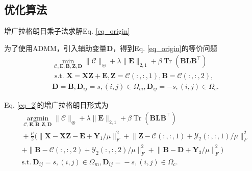 \documentclass{beamer}
\begin{document}
\subsection{优化算法}

\begin{frame}{增广拉格朗日乘子法求解Eq. \eqref{eq_origin}}

    为了使用ADMM，引入辅助变量$\mathbf{D}$，得到Eq. \eqref{eq_origin}的等价问题
	\begin{equation}
		\begin{aligned}
			&\min_{\mathcal{C}, \mathbf{E}, \mathbf{B}, \mathbf{Z}, \mathbf{D} }\|\mathcal{C}\|_{\circledast}+\lambda\|\mathbf{E}\|_{2,1}+\beta\operatorname{Tr}(\mathbf{B L B}^{\top}) \\
			&\text { s.t. } \mathbf{X}=\mathbf{X Z}+\mathbf{E}, \mathbf{Z}=\mathcal{C}(:,:,1), \mathbf{B}=\mathcal{C}(:,:,2),\\
			&\mathbf{D}=\mathbf{B}, \mathbf{D}_{i j}=s,(i, j) \in \Omega_{m}, \mathbf{D}_{i j}=-s,(i, j) \in \Omega_{c}. 
		\end{aligned}
		\label{eq_2}
	\end{equation}

    Eq. \eqref{eq_2}的增广拉格朗日形式为
	\begin{equation}
		\begin{aligned}
			&\underset{\mathcal{C}, \mathbf{E}, \mathbf{B}, \mathbf{Z}, \mathbf{D}}{\operatorname{argmin}}\|\mathcal{C}\|_{\circledast}\!+\!\lambda\|\mathbf{E}\|_{2,1}\!+\!\beta\operatorname{Tr}(\mathbf{B L B}^{\top}) \\
			&\!+\!\frac{\mu}{2}\!(\|\mathbf{X}\!-\!\mathbf{X\!Z}\!-\!\mathbf{E}\!+\!\mathbf{Y}_{1}\!/ \mu\|_{F}^{2}\!+\!\|\mathbf{Z}\!-\!\mathcal{C}\!(:\!,\!:\!,\!1\!)\!+\!\mathcal{Y}_{2}\!(:\!,\!:\!,\!1\!)\!/\! \mu\|_{F}^{2}\\
			&+\|\mathbf{B}\!-\!\mathcal{C}(:,:,2)\!+\!\mathcal{Y}_{2}(:,:,2)\!/\! \mu\|_{F}^{2}\!+\!\|\mathbf{B}\!-\!\mathbf{D}\!+\!\mathbf{Y}_{3}\!/\!\mu\|_{F}^{2}) \\
			&\text {s.t.}~\mathbf{D}_{i j}\!=\!s,(i,j)\!\in\!\Omega_{m}, \mathbf{D}_{i j}\!=\!-\!s,(i,j)\!\in\!\Omega_{c}.
		\end{aligned}
		\label{eq_3}
	\end{equation}
\end{frame}
\end{document}
